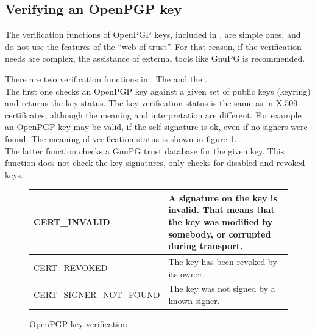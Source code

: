 \subsection{Verifying an OpenPGP key}
The verification functions of OpenPGP keys, included in \gnutls{}, 
are simple ones, and do not use the features of the ``web of trust''.
For that reason, if the verification needs are complex, 
the assistance of external tools like GnuPG is recommended.
\par
There are two verification functions in \gnutls{},
The 
and the . 
\\
The first one checks an OpenPGP key against a given set of public keys (keyring) and
returns the key status. The key verification status is the same as in X.509 certificates,
although the meaning and interpretation are different. For example an OpenPGP key may
be valid, if the self signature is ok, even if no signers were found.
The meaning of verification status is shown in figure \ref{fig:pgp_verify}.
\\
The latter function checks a GnuPG trust database for the given key. This function does not
check the key signatures, only checks for disabled and revoked keys.

\begin{figure}[hbtp]
\begin{tabular}{|l|p{9cm}|}

\hline
CERT\_INVALID & A signature on the key is invalid. That means that the key was modified
by somebody, or corrupted during transport.
\\
\hline
CERT\_REVOKED & The key has been revoked by its owner.
\\
\hline
CERT\_SIGNER\_NOT\_FOUND & The key was not signed by a known signer.
\\
\hline
\end{tabular}
\caption{OpenPGP key verification}
\label{fig:pgp_verify}
\end{figure}

